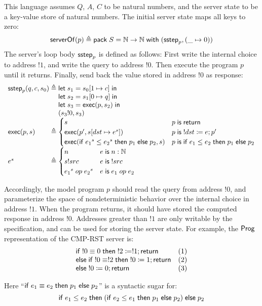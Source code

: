 This language assumes $Q$, $A$, $C$ to be natural numbers, and the server state
to be a key-value store of natural numbers.  The initial server state maps all
keys to zero:
\[\mathsf{serverOf}(p)\triangleq\mathsf{pack}\;S=\mathbb N\to\mathbb N\;\mathsf{with}\;(\mathsf{sstep}_p,(\_\mapsto0))\]
The server's loop body $\mathsf{sstep}_p$ is defined as follows: First write the
internal choice to address $!1$, and write the query to address $!0$.  Then
execute the program $p$ until it returns.  Finally, send back the value stored
in address $!0$ as response:
\[\begin{array}{l@{\;}r@{\;}l}
\sstep_p(q,c,s_0)&\triangleq&\letin{s_1}{\update{s_0}{1}{c}}\\
&&\letin{s_2}{\update{s_1}{0}{q}}\\
&&\letin{s_3}{\Exec(p,s_2)}\\
&&(s_3!0,s_3)\\
\Exec(p,s)&\triangleq&
\begin{cases}
  s&p\Is\Return\\
  \Exec(p',\update{s}{dst}{e^s})&p\Is !dst\coloneqq e;p'\\
  \Exec(\If {e_1}^s\le{e_2}^s\Then p_1\Else p_2,s)&p\Is\If e_1\le e_2\Then p_1\Else p_2
\end{cases}\\
e^s&\triangleq&
\begin{cases}
  n&e\Is n:\Nat\\
  s!src&e\Is !src\\
  {e_1}^s\;op\;{e_2}^s&e\Is e_1\;op\;e_2
\end{cases}
\end{array}\]

Accordingly, the model program $p$ should read the query from address $!0$, and
parameterize the space of nondeterministic behavior over the internal choice in
address $!1$.  When the program returns, it should have stored the computed
response in address $!0$.  Addresses greater than $!1$ are only writable by the
specification, and can be used for storing the server state.  For example, the
$\mathsf{Prog}$ representation of the CMP-RST server is:
\[\begin{array}{ll}
\mathsf{if}\; !0\equiv0\;\mathsf{then}\; !2\coloneqq!1;\mathsf{return}&(1)\\
\mathsf{else}\;\mathsf{if}\; !0\equiv!2\;\mathsf{then}\;!0\coloneqq1;\mathsf{return}&(2)\\
\mathsf{else}\;!0\coloneqq0;\mathsf{return}&(3)
\end{array}\]

Here ``$\mathsf{if}\; e_1\equiv e_2\;\mathsf{then}\; p_1\;\mathsf{else}\; p_2$'' is a syntactic sugar for:
\[\mathsf{if}\; e_1\le e_2\;\mathsf{then}\;(\mathsf{if}\; e_2\le e_1\;\mathsf{then}\; p_1\;\mathsf{else}\; p_2)\;\mathsf{else}\; p_2\]

